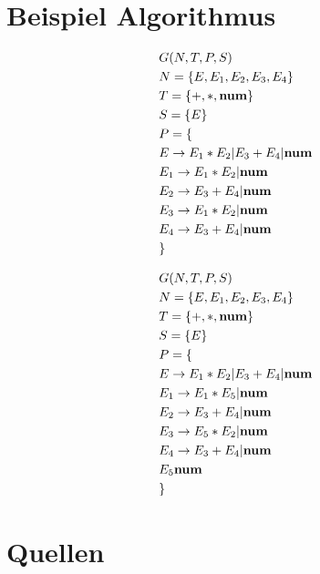 \documentclass[t]{beamer}
\begin{document}
	\section{Beispiel Algorithmus}\label{sec:beispiel-algorithmus2}
	\begin{frame}
		\begin{minipage}[c]{0.5\textwidth}
			\begin{align*}
				& G(N,T,P,S) \\
				& N= \{E, E_1, E_2, E_3, E_4\} \\
				& T= \{+, *, \bold{num}\} \\
				& S= \{E\} \\
				& P = \{ \\
				& E     \rightarrow E_1 * E_2 | E_3 + E_4 | \bold{num} \\
				& E_1   \rightarrow E_1 * E_2 | \bold{num} \\
				& E_2   \rightarrow E_3 + E_4 | \bold{num} \\
				& E_3   \rightarrow E_1 * E_2 | \bold{num} \\
				& E_4   \rightarrow E_3 + E_4 | \bold{num} \\
				& \}
			\end{align*}
		\end{minipage}\begin{minipage}[c]{0.5\textwidth}
			              \begin{align*}
				              & G(N,T,P,S) \\
				              & N= \{E, E_1, E_2, E_3, E_4\} \\
				              & T= \{+, *, \bold{num}\} \\
				              & S= \{E\} \\
				              & P = \{ \\
				              & E     \rightarrow E_1 * E_2 | E_3 + E_4 | \bold{num} \\
				              & E_1   \rightarrow E_1 * E_5 | \bold{num} \\
				              & E_2   \rightarrow E_3 + E_4 | \bold{num} \\
				              & E_3   \rightarrow E_5 * E_2 | \bold{num} \\
				              & E_4   \rightarrow E_3 + E_4 | \bold{num} \\
				              & E_5   \bold{num} \\
				              & \}
			              \end{align*}
		\end{minipage}
	\end{frame}


	\section{Quellen}\label{sec:quellen}
	\begin{frame}[allowframebreaks]
		
		
	\end{frame}
\end{document}
